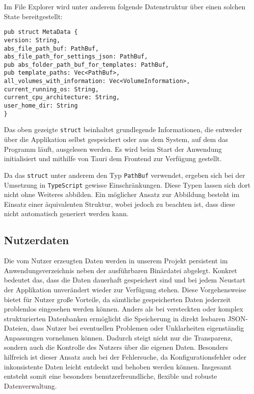 \newpage
Im File Explorer wird unter anderem folgende Datenstruktur über einen solchen State bereitgestellt:

{\small
\begin{verbatim}
pub struct MetaData {
version: String,
abs_file_path_buf: PathBuf,
abs_file_path_for_settings_json: PathBuf,
pub abs_folder_path_buf_for_templates: PathBuf,
pub template_paths: Vec<PathBuf>,
all_volumes_with_information: Vec<VolumeInformation>,
current_running_os: String,
current_cpu_architecture: String,
user_home_dir: String
}
\end{verbatim}
}

Das oben gezeigte \verb|struct| beinhaltet grundlegende Informationen, die entweder über die Applikation selbst gespeichert oder
aus dem System, auf dem das Programm läuft, ausgelesen werden. Es wird beim Start der Anwendung initialisiert und mithilfe von
Tauri dem Frontend zur Verfügung gestellt.

Da das \verb|struct| unter anderem den Typ \verb|PathBuf| verwendet, ergeben sich bei der Umsetzung in \verb|TypeScript| gewisse
Einschränkungen. Diese Typen lassen sich dort nicht ohne Weiteres abbilden. Ein möglicher Ansatz zur Abbildung besteht im Einsatz
einer äquivalenten Struktur, wobei jedoch zu beachten ist, dass diese nicht automatisch generiert werden kann.

\subsection{Nutzerdaten}
Die vom Nutzer erzeugten Daten werden in unserem Projekt persistent im
Anwendungsverzeichnis neben der ausführbaren Binärdatei abgelegt. Konkret bedeutet das, dass die
Daten dauerhaft gespeichert sind und bei jedem Neustart der Applikation unverändert wieder zur
Verfügung stehen. Diese Vorgehensweise bietet für Nutzer große Vorteile, da sämtliche gespeicherten
Daten jederzeit problemlos eingesehen werden können. Anders als bei versteckten oder komplex
strukturierten Datenbanken ermöglicht die Speicherung in direkt lesbaren JSON-Dateien, dass Nutzer
bei eventuellen Problemen oder Unklarheiten eigenständig Anpassungen vornehmen können. Dadurch
steigt nicht nur die Transparenz, sondern auch die Kontrolle des Nutzers über die eigenen Daten.
Besonders hilfreich ist dieser Ansatz auch bei der Fehlersuche, da Konfigurationsfehler oder
inkonsistente Daten leicht entdeckt und behoben werden können. Insgesamt entsteht somit eine
besonders benutzerfreundliche, flexible und robuste Datenverwaltung.